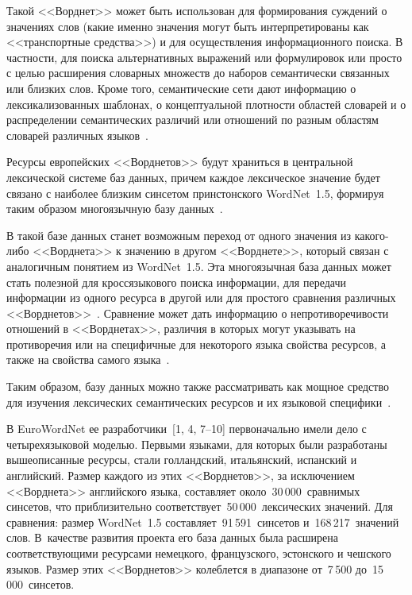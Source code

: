 \begin{multicols}{2}
     Такой <<Ворднет>> может быть использован для формирования 
суждений о значениях слов (какие именно значения могут быть 
интерпретированы как <<транспортные средства>>) и для осуществления 
информационного поиска. В частности, для поиска альтернативных выражений 
или формулировок или просто с целью расширения словарных множеств до 
наборов семантически связанных или близких слов. Кроме того, 
семантические сети дают информацию о лексикализованных шаблонах, о 
концептуальной плотности областей словарей и о распределении 
семантических различий или отношений по разным областям словарей 
различных языков~\cite{4koz}.
     
     Ресурсы европейских <<Ворднетов>> будут храниться в центральной 
лексической системе баз данных, причем каждое лексическое значение будет 
связано с наиболее близким синсетом принстонского WordNet~1.5, формируя 
таким образом многоязычную базу данных~\cite{1koz, 4koz}.
     
     В такой базе данных станет возможным переход от одного значения из 
какого-либо <<Ворднета>> к значению в другом <<Ворднете>>, который 
связан с аналогичным понятием из WordNet~1.5. Эта многоязычная база 
данных может стать полезной для кроссязыкового поиска информации, для 
передачи информации из одного ресурса в другой или для простого сравнения 
различных <<Ворднетов>>~\cite{7koz}. Сравнение может дать информацию о 
непротиворечивости отношений в <<Ворднетах>>, различия в которых могут 
указывать на противоречия или на специфичные для некоторого языка 
свойства ресурсов, а также на свойства самого языка~\cite{4koz}.
     
     Таким образом, базу данных можно также рассматривать как мощное 
средство для изучения лексических семантических ресурсов и их языковой 
специфики~\cite{8koz}.
     
В EuroWordNet ее разработчики~[1, 4, 7--10] первоначально имели дело с 
четырехязыковой мо\-делью. Первыми языками, для которых были разработаны 
вышеописанные ресурсы, стали голландский, итальянский, испанский и 
английский. %
 Размер каж\-до\-го из этих <<Ворднетов>>, за исключением 
<<Ворднета>> английского языка, составляет около~30\,000~сравнимых 
синсетов, что приблизительно соответствует~50\,000~лексических значений. 
Для сравнения: размер WordNet~1.5 составляет~91\,591~синсетов и~168\,217~значений слов. 
В~качестве развития проекта его база данных была расширена 
соответствующими ресурсами немецкого, французского, эстонского и 
чешского языков. Размер этих <<Ворднетов>> колеблется в диапазоне от~7\,500 до~15\,000~синсетов.
     

\end{multicols}
